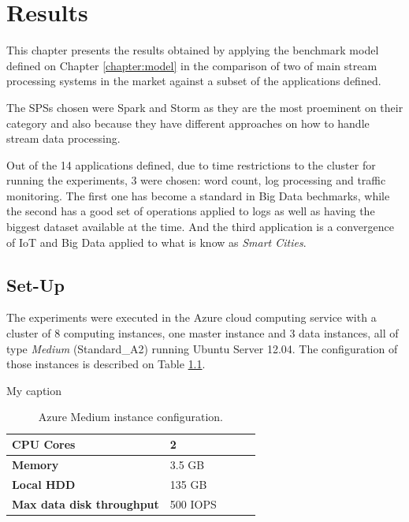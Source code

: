 \documentclass[ppgc,diss,english]{iiufrgs}
\begin{document}
\chapter{Results}
\label{chapter:results}

This chapter presents the results obtained by applying the benchmark model defined on Chapter \ref{chapter:model} in the comparison of two of main stream processing systems in the market against a subset of the applications defined.

The SPSs chosen were Spark and Storm as they are the most proeminent on their category and also because they have different approaches on how to handle stream data processing.

Out of the 14 applications defined, due to time restrictions to the cluster for running the experiments, 3 were chosen: word count, log processing and traffic monitoring. The first one has become a standard in Big Data bechmarks, while the second has a good set of operations applied to logs as well as having the biggest dataset available at the time. And the third application is a convergence of IoT and Big Data applied to what is know as \textit{Smart Cities}.

\section{Set-Up}
\label{sec:set-up}

The experiments were executed in the Azure cloud computing service with a cluster of 8 computing instances, one master instance and 3 data instances, all of type \textit{Medium} (Standard\_A2) running Ubuntu Server 12.04. The configuration of those instances is described on Table \ref{table:azure_medium_config}.

\begin{table}[h]
\centering
\caption{My caption}
\label{my-label}
\begin{tabular}{lllll}
\hline
\textbf{CPU Cores}                & 2        &  &  &  \\ \hline
\textbf{Memory}                   & 3.5 GB   &  &  &  \\ \hline
\textbf{Local HDD}                & 135 GB   &  &  &  \\ \hline
\textbf{Max data disk throughput} & 500 IOPS &  &  &  \\ \hline
\end{tabular}
\caption{Azure Medium instance configuration.}
	\label{table:azure_medium_config}
\end{table}
\end{document}
